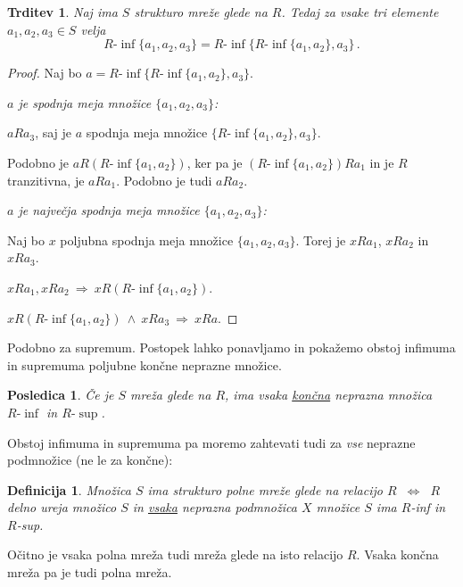 \documentclass[11pt,paper=b5,DIV=13,headinclude,footinclude]{scrbook}
\def\inn {{~\wedge~}}
\def\sledi {{~\Rightarrow~}}
\def\cee {{~\Leftrightarrow~}}
\newtheorem*{trditev}{Trditev}
\newtheorem*{posledica}{Posledica}
\newtheorem*{definicija}{Definicija}
\begin{document}
\begin{trditev}
Naj ima $S$ strukturo mreže glede na $R$. Tedaj za vsake tri elemente $a_1,a_2,a_3\in S$ velja
$$R\textrm{-}\inf\{a_1,a_2,a_3\} = R\textrm{-}\inf\{R\textrm{-}\inf\{a_1,a_2\}, a_3\}\,.$$
\end{trditev}

\begin{proof}
Naj bo $a = R\textrm{-}\inf\{R\textrm{-}\inf\{a_1,a_2\}, a_3\}$.

\emph{ $a$ je spodnja meja množice $\{a_1,a_2,a_3\}$:}

  $aRa_3$, saj je $a$ spodnja meja množice $\{R\textrm{-}\inf\{a_1,a_2\}, a_3\}$.

  Podobno je
  $aR(R\textrm{-}\inf\{a_1,a_2\})$, ker pa je $(R\textrm{-}\inf\{a_1,a_2\})Ra_1$ in je $R$ tranzitivna, je $aRa_1$. Podobno je tudi $aRa_2$.


\emph{ $a$ je največja spodnja meja množice $\{a_1,a_2,a_3\}$:}

Naj bo $x$ poljubna spodnja meja množice $\{a_1,a_2,a_3\}$. Torej je $xRa_1$, $xRa_2$ in $xRa_3$.

$xRa_1, xRa_2\sledi xR(R\textrm{-}\inf\{a_1,a_2\})$.

$xR(R\textrm{-}\inf\{a_1,a_2\}) \inn xRa_3\sledi xRa$.
\end{proof}

Podobno za supremum. Postopek lahko ponavljamo in
pokažemo obstoj infimuma in supremuma poljubne končne neprazne množice.

\medskip
%

\begin{posledica}
Če je $S$ mreža glede na $R$, ima vsaka \underline{končna} neprazna množica $R\textrm{-}\inf$
in $R\textrm{-}\sup$.
\end{posledica}

Obstoj infimuma in supremuma pa moremo zahtevati tudi za \emph{ vse} neprazne podmnožice (ne le za končne):

\begin{definicija}
Množica $S$ ima strukturo {\em polne mreže} glede na relacijo $R$ $\cee$
$R$ delno ureja množico $S$ in \underline{vsaka} neprazna podmnožica $X$ množice $S$ ima $R$-inf in $R$-sup.
\end{definicija}

Očitno je vsaka polna mreža tudi mreža glede na isto relacijo $R$. Vsaka končna mreža pa je tudi polna mreža.
\end{document}
